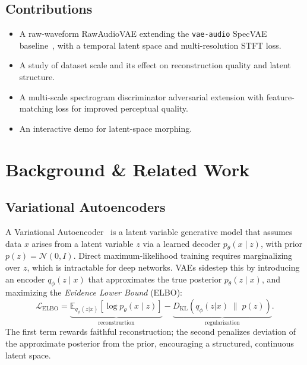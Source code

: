 \documentclass[10pt, twocolumn]{article}
\begin{document}
\subsection*{Contributions}
\begin{itemize}[leftmargin=1.2em, noitemsep, topsep=2pt]
    \item A raw-waveform RawAudioVAE extending the \texttt{vae-audio}
          SpecVAE baseline~\cite{yjlolo}, with a temporal latent space
          and multi-resolution STFT loss.
    \item A study of dataset scale and its
          effect on reconstruction quality and latent structure.
    \item A multi-scale spectrogram discriminator adversarial extension
          with feature-matching loss for improved perceptual quality.
    \item An interactive demo for latent-space morphing.
\end{itemize}

\section{Background \& Related Work}
\label{sec:background}

\subsection{Variational Autoencoders}

A Variational Autoencoder~\cite{kingma2022autoencodingvariationalbayes} is a latent variable generative
model that assumes data $x$ arises from a latent variable $z$ via a
learned decoder $p_\theta(x \mid z)$, with prior $p(z) = \mathcal{N}(0, I)$.
Direct maximum-likelihood training requires marginalizing over $z$, which is
intractable for deep networks.
VAEs sidestep this by introducing an encoder $q_\phi(z \mid x)$ that
approximates the true posterior $p_\theta(z \mid x)$, and maximizing the
\textit{Evidence Lower Bound} (ELBO):
\begin{equation}
    \mathcal{L}_{\text{ELBO}} =
        \underbrace{\mathbb{E}_{q_\phi(z|x)}\!\left[\log p_\theta(x \mid z)\right]}_{\text{reconstruction}}
        - \underbrace{D_{\mathrm{KL}}\!\left(q_\phi(z|x) \;\|\; p(z)\right)}_{\text{regularization}}.
    \label{eq:elbo}
\end{equation}
The first term rewards faithful reconstruction; the second penalizes deviation
of the approximate posterior from the prior, encouraging a structured,
continuous latent space.
\end{document}
